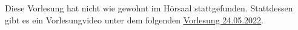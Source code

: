 Diese Vorlesung hat nicht wie gewohnt im Hörsaal stattgefunden. 
Stattdessen gibt es ein Vorlesungvideo unter dem folgenden 
\href{https://ls2-web.cs.tu-dortmund.de/~mamicoja/dap2/videos/lec_bfsdfs.mp4}{\underline{Vorlesung 24.05.2022}}.